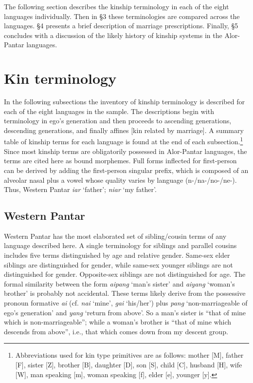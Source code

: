 The following section describes the kinship terminology in each of the eight languages individually. Then in {\S}3 these terminologies are compared across the languages. {\S}4 presents a brief description of marriage prescriptions. Finally, {\S}5 concludes with a discussion of the likely history of kinship systems in the Alor-Pantar languages.


\section{Kin terminology}
In the following subsections the inventory of kinship terminology is described for each of the eight languages in the sample. The descriptions begin with terminology in ego's generation and then proceeds to ascending generations, descending generations, and finally affines [kin related by marriage]. A summary table of kinship terms for each language is found at the end of each subsection.\footnote{{ }  Abbreviations used for kin type primitives are as follows: mother [M], father [F], sister [Z], brother [B], daughter [D], son [S], child [C], husband [H], wife [W], man speaking [m], woman speaking [f], elder [e], younger [y].}   Since most kinship terms are obligatorily possessed in Alor-Pantar languages, the terms are cited here as bound morphemes. Full forms inflected for first-person can be derived by adding the first-person singular prefix, which is composed of an alveolar nasal plus a vowel whose quality varies by language (n-/na-/no-/ne-). Thus, Western Pantar \textit{iar} `father'; \textit{niar} `my father'.

\subsection{Western Pantar}
Western Pantar has the most elaborated set of sibling/cousin terms of any language described here. A single terminology for siblings and parallel cousins includes five terms distinguished by age and relative gender. Same-sex elder siblings are distinguished for gender, while same-sex younger siblings are not distinguished for gender. Opposite-sex siblings are not distinguished for age. The formal similarity between the form \textit{aipang} `man's sister' and \textit{aiyang} `woman's brother' is probably not accidental. These terms likely derive from the possessive pronoun formative \textit{ai} (cf. \textit{nai} `mine', \textit{gai} `his/her') plus \textit{pang} `non-marriageable of ego's generation' and \textit{yang} `return from above'. So a man's sister is ``that of mine which is non-marriageable''; while a woman's brother is ``that of mine which descends from above'', i.e., that which comes down from my descent group.

